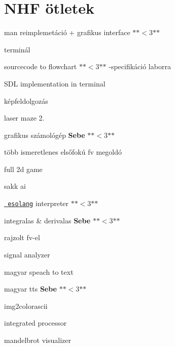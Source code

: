 \chapter{NHF ötletek}
\hypertarget{md__n_h_f__otletek}{}\label{md__n_h_f__otletek}
\label{md__n_h_f__otletek_autotoc_md16}%
%

\begin{DoxyItemize}
\item man reimplemetáció + grafikus interface \texorpdfstring{$\ast$}{*}\texorpdfstring{$\ast$}{*}\texorpdfstring{$<$}{<}3\texorpdfstring{$\ast$}{*}\texorpdfstring{$\ast$}{*}
\item terminál
\item sourcecode to flowchart \texorpdfstring{$\ast$}{*}\texorpdfstring{$\ast$}{*}\texorpdfstring{$<$}{<}3\texorpdfstring{$\ast$}{*}\texorpdfstring{$\ast$}{*} -\/specifikáció laborra
\item SDL implementation in terminal
\item képfeldolgozás
\item laser maze 2.
\item grafikus számológép {\bfseries{Sebe}} \texorpdfstring{$\ast$}{*}\texorpdfstring{$\ast$}{*}\texorpdfstring{$<$}{<}3\texorpdfstring{$\ast$}{*}\texorpdfstring{$\ast$}{*}
\begin{DoxyItemize}
\item több ismeretlenes elsőfokú fv megoldó
\end{DoxyItemize}
\item full 2d game
\item sakk ai
\item \href{https://esolangs.org/wiki/Main_Page}{\texttt{ esolang}} interpreter \texorpdfstring{$\ast$}{*}\texorpdfstring{$\ast$}{*}\texorpdfstring{$<$}{<}3\texorpdfstring{$\ast$}{*}\texorpdfstring{$\ast$}{*}
\item integralas \& derivalas {\bfseries{Sebe}} \texorpdfstring{$\ast$}{*}\texorpdfstring{$\ast$}{*}\texorpdfstring{$<$}{<}3\texorpdfstring{$\ast$}{*}\texorpdfstring{$\ast$}{*}
\begin{DoxyItemize}
\item rajzolt fv-\/el
\end{DoxyItemize}
\item signal analyzer
\item magyar speach to text
\item magyar tts {\bfseries{Sebe}} \texorpdfstring{$\ast$}{*}\texorpdfstring{$\ast$}{*}\texorpdfstring{$<$}{<}3\texorpdfstring{$\ast$}{*}\texorpdfstring{$\ast$}{*}
\item img2colorascii
\item integrated processor
\item mandelbrot visualizer 
\end{DoxyItemize}